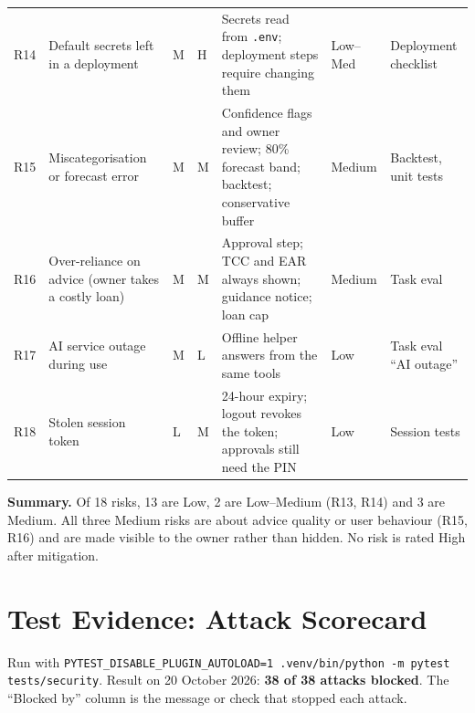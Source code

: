 \documentclass[10pt,a4paper]{article}
\newcommand{\code}[1]{\texttt{\small #1}}
\begin{document}
\begin{longtable}{@{}p{0.6cm}L{2.5cm}p{0.5cm}p{0.5cm}L{5.4cm}L{1.6cm}L{1.6cm}@{}}
R14 & Default secrets left in a deployment & M & H & Secrets read from \code{.env}; deployment steps require changing them & Low--Med & Deployment checklist\\
R15 & Miscategorisation or forecast error & M & M & Confidence flags and owner review; 80\% forecast band; backtest; conservative buffer & Medium & Backtest, unit tests\\
R16 & Over-reliance on advice (owner takes a costly loan) & M & M & Approval step; TCC and EAR always shown; guidance notice; loan cap & Medium & Task eval\\
R17 & AI service outage during use & M & L & Offline helper answers from the same tools & Low & Task eval ``AI outage''\\
R18 & Stolen session token & L & M & 24-hour expiry; logout revokes the token; approvals still need the PIN & Low & Session tests\\
\bottomrule
\end{longtable}
\endgroup

\textbf{Summary.} Of 18 risks, 13 are Low, 2 are Low--Medium (R13, R14) and 3 are Medium. All three Medium risks are about advice quality or user behaviour (R15, R16) and are made visible to the owner rather than hidden. No risk is rated High after mitigation.

\section{Test Evidence: Attack Scorecard}
\label{sec:attacks}

Run with \code{PYTEST\_DISABLE\_PLUGIN\_AUTOLOAD=1 .venv/bin/python -m pytest tests/security}. Result on 20 October 2026: \textbf{38 of 38 attacks blocked}. The ``Blocked by'' column is the message or check that stopped each attack.
\end{document}
